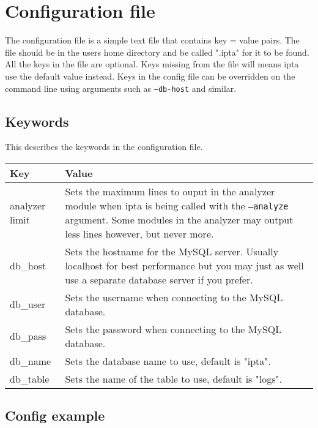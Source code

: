 \documentclass[english,twoside,openright,a4paper,12pt]{article}
\begin{document}
\section{Configuration file}

The configuration file is a simple text file that contains key = value
pairs. The file should be in the users home directory and be called
".ipta" for it to be found. All the keys in the file are optional.
Keys missing from the file will means ipta use the default value
instead. Keys in the config file can be overridden on the command line
using arguments such as \texttt{--db-host} and similar.

\subsection{Keywords}

This describes the keywords in the configuration file.

\begin{longtable}{|p{}|p{}|}
\hline Key & Value\\ \hline analyzer limit & Sets the maximum lines to
ouput in the analyzer module when ipta is being called with the
\texttt{--analyze} argument. Some modules in the analyzer may output
less lines however, but never more.\\ \hline

db\_host & Sets the hostname for the MySQL server. Usually localhost
for best performance but you may just as well use a separate database
server if you prefer.\\\hline

db\_user & Sets the username when connecting to the MySQL
database.\\\hline

db\_pass & Sets the password when connecting to the MySQL
database.\\\hline

db\_name & Sets the database name to use, default is "ipta".\\\hline

db\_table & Sets the name of the table to use, default is
"logs".\\\hline
\end{longtable}

\subsection{Config example}
\end{document}
